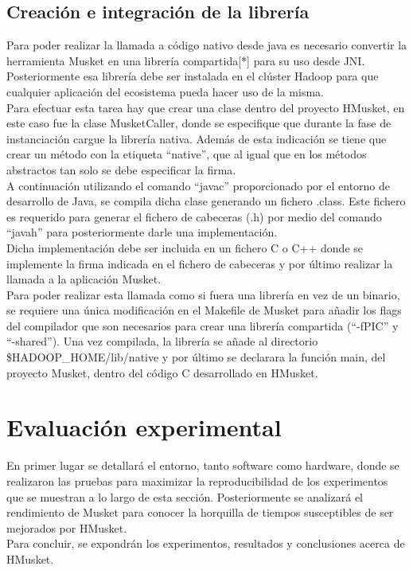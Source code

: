 \documentclass[conference]{IEEEtran}
\begin{document}
\subsection{Creación e integración de la librería}
Para poder realizar la llamada a código nativo desde java es necesario convertir la herramienta Musket en una librería compartida[*] para su uso desde JNI. Posteriormente esa librería debe ser instalada en el clúster Hadoop para que cualquier aplicación del ecosistema pueda hacer uso de la misma.\\
Para efectuar esta tarea hay que crear una clase dentro del proyecto HMusket, en este caso fue la clase MusketCaller, donde se especifique que durante la fase de instanciación cargue la librería nativa. Además de esta indicación se tiene que crear un método con la etiqueta ``native'', que al igual que en los métodos abstractos tan solo se debe especificar la firma.\\
A continuación utilizando el comando ``javac'' proporcionado por el entorno de desarrollo de Java, se compila dicha clase generando un fichero .class. Este fichero es requerido para generar el fichero de cabeceras (.h) por medio del comando ``javah'' para posteriormente darle una implementación.\\
Dicha implementación debe ser incluida en un fichero C o C++ donde se implemente la firma indicada en el fichero de cabeceras y por último realizar la llamada a la aplicación Musket.\\
Para poder realizar esta llamada como si fuera una librería en vez de un binario, se requiere una única modificación en el Makefile de Musket para añadir los flags del compilador que son necesarios para crear una librería compartida (``-fPIC'' y ``-shared''). Una vez compilada, la librería se añade al directorio \$HADOOP\_HOME/lib/native y por último se declarara la función main, del proyecto Musket, dentro del código C desarrollado en HMusket.

\section{Evaluación experimental}
En primer lugar se detallará el entorno, tanto software como hardware, donde se realizaron las pruebas para maximizar la reproducibilidad de los experimentos que se muestran a lo largo de esta sección. Posteriormente se analizará el rendimiento de Musket para conocer la horquilla de tiempos susceptibles de ser mejorados por HMusket.\\
Para concluir, se expondrán los experimentos, resultados y conclusiones acerca de HMusket.
\end{document}
